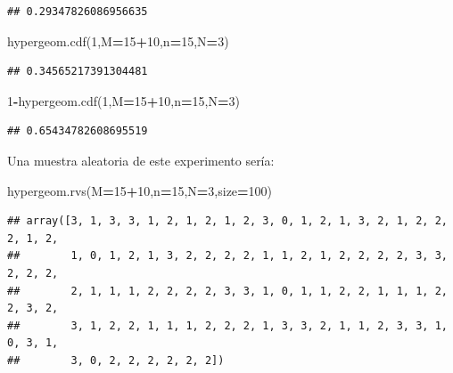 \documentclass[]{book}
\newenvironment{Shaded}{\begin{snugshade}}{\end{snugshade}}
\newcommand{\DecValTok}[1]{\textcolor[rgb]{0.00,0.00,0.81}{#1}}
\newcommand{\NormalTok}[1]{#1}
\newcommand{\OperatorTok}[1]{\textcolor[rgb]{0.81,0.36,0.00}{\textbf{#1}}}
\begin{document}
\begin{verbatim}
## 0.29347826086956635
\end{verbatim}

\begin{Shaded}
\begin{Highlighting}[]
\NormalTok{hypergeom.cdf(}\DecValTok{1}\NormalTok{,M}\OperatorTok{=}\DecValTok{15}\OperatorTok{+}\DecValTok{10}\NormalTok{,n}\OperatorTok{=}\DecValTok{15}\NormalTok{,N}\OperatorTok{=}\DecValTok{3}\NormalTok{)}
\end{Highlighting}
\end{Shaded}

\begin{verbatim}
## 0.34565217391304481
\end{verbatim}

\begin{Shaded}
\begin{Highlighting}[]
\DecValTok{1}\OperatorTok{-}\NormalTok{hypergeom.cdf(}\DecValTok{1}\NormalTok{,M}\OperatorTok{=}\DecValTok{15}\OperatorTok{+}\DecValTok{10}\NormalTok{,n}\OperatorTok{=}\DecValTok{15}\NormalTok{,N}\OperatorTok{=}\DecValTok{3}\NormalTok{)}
\end{Highlighting}
\end{Shaded}

\begin{verbatim}
## 0.65434782608695519
\end{verbatim}

Una muestra aleatoria de este experimento sería:

\begin{Shaded}
\begin{Highlighting}[]
\NormalTok{hypergeom.rvs(M}\OperatorTok{=}\DecValTok{15}\OperatorTok{+}\DecValTok{10}\NormalTok{,n}\OperatorTok{=}\DecValTok{15}\NormalTok{,N}\OperatorTok{=}\DecValTok{3}\NormalTok{,size}\OperatorTok{=}\DecValTok{100}\NormalTok{)}
\end{Highlighting}
\end{Shaded}

\begin{verbatim}
## array([3, 1, 3, 3, 1, 2, 1, 2, 1, 2, 3, 0, 1, 2, 1, 3, 2, 1, 2, 2, 2, 1, 2,
##        1, 0, 1, 2, 1, 3, 2, 2, 2, 2, 1, 1, 2, 1, 2, 2, 2, 2, 3, 3, 2, 2, 2,
##        2, 1, 1, 1, 2, 2, 2, 2, 3, 3, 1, 0, 1, 1, 2, 2, 1, 1, 1, 2, 2, 3, 2,
##        3, 1, 2, 2, 1, 1, 1, 2, 2, 2, 1, 3, 3, 2, 1, 1, 2, 3, 3, 1, 0, 3, 1,
##        3, 0, 2, 2, 2, 2, 2, 2])
\end{verbatim}
\end{document}
